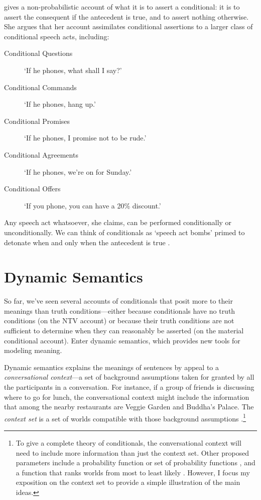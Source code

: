 \citet{edgington-conditionals} gives a non-probabilistic account of what it is to assert a conditional: it is to assert the consequent if the antecedent is true, and to assert nothing otherwise.  She argues that her account assimilates conditional assertions to a larger class of conditional speech acts, including:
\begin{description}
\item[Conditional Questions] `If he phones, what shall I say?'
\item[Conditional Commands] `If he phones, hang up.'
\item[Conditional Promises] `If he phones, I promise not to be rude.'
\item[Conditional Agreements] `If he phones, we're on for Sunday.'
\item[Conditional Offers] `If you phone, you can have a 20\% discount.'
\end{description}
Any speech act whatsoever, she claims, can be performed conditionally or unconditionally.  We can think of conditionals as `speech act bombs' primed to detonate when and only when the antecedent is true \citep[see][]{Egan2009-EGABBA}.



\section{Dynamic Semantics}

So far, we've seen several accounts of conditionals that posit more to their meanings than truth conditions---either because conditionals have no truth conditions (on the NTV account) or because their truth conditions are not sufficient to determine when they can reasonably be asserted (on the material conditional account).  Enter dynamic semantics, which provides new tools for modeling meaning.

Dynamic semantics explains the meanings of sentences by appeal to a \emph{conversational context}---a set of background assumptions taken for granted by all the participants in a conversation.  For instance, if a group of friends is discussing where to go for lunch, the conversational context might include the information that among the nearby restaurants are Veggie Garden and Buddha's Palace.  The \emph{context set} is a set of worlds compatible with those background assumptions \citep[see][84]{stalnaker-assertion}.\footnote{To give a complete theory of conditionals, the conversational context will need to include more information than just the context set.  Other proposed parameters include a probability function or set of probability functions \citep{yalcin-epistemic, yalcin-bayesian}, and a function that ranks worlds from most to least likely \citep{spohn-ranking}.  However, I focus my exposition on the context set to provide a simple illustration of the main ideas.}


